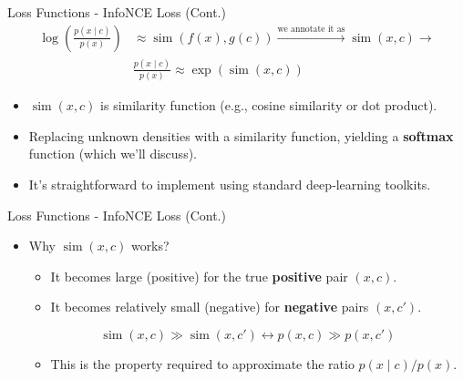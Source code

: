 \documentclass[serif, aspectratio=169]{beamer}
\begin{document}
\begin{frame}{Loss Functions - InfoNCE Loss (Cont.)}
    \begin{equation}
    \begin{split}
        \log \left(\frac{p\left(x \mid c\right)}{p\left(x\right)}\right) &\approx
        \operatorname{sim}\left(f\left(x\right), g\left(c\right) \right)    \xrightarrow{\text{we annotate it as}}
        \operatorname{sim}\left(x, c \right) \xrightarrow{} \\&
        \frac{p\left(x \mid c\right)}{p\left(x\right)} \approx
        \exp\left( \operatorname{sim}\left(x, c \right) \right)
    \end{split}
    \end{equation}

     \begin{itemize}
         \item $\operatorname{sim}\left(x, c \right)$ is similarity function (e.g., cosine similarity or dot product).
         \item Replacing unknown densities with a similarity function, yielding a \textbf{softmax} function (which we'll discuss).
         \item It’s straightforward to implement using standard deep‐learning toolkits.
     \end{itemize}
\end{frame}


\begin{frame}{Loss Functions - InfoNCE Loss (Cont.)}
    \begin{itemize}
        \item Why $\operatorname{sim}\left(x, c \right)$ works?

        \begin{itemize}
            \item It becomes large (positive) for the true \textbf{positive} pair $\left(x,c\right)$.
            \item It becomes relatively small (negative) for \textbf{negative} pairs $\left(x,c'\right)$.
        \end{itemize}

        \begin{equation*}
            \operatorname{sim}\left(x, c \right) \gg \operatorname{sim}\left(x, c' \right) \longleftrightarrow
            p\left(x, c \right) \gg p\left(x, c' \right)
        \end{equation*}

        \begin{itemize}
            \item This is the property required to approximate the ratio $p\left(x \mid c\right)/p\left(x\right)$.
        \end{itemize}
    \end{itemize}
\end{frame}
\end{document}
